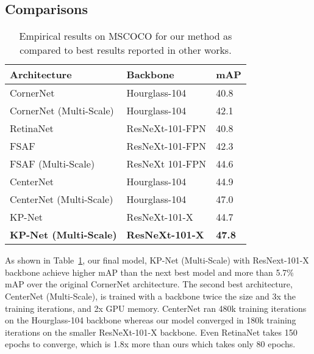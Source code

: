 \documentclass[10pt,twocolumn,letterpaper]{article}
\begin{document}
\subsection{Comparisons}
\vspace{-0.25cm}
\begin{table}[]
\caption{Empirical results on MSCOCO for our method as compared to best results reported in other works.}
\begin{tabular}{@{}lll@{}}
 \hline
\textbf{Architecture}              & \textbf{Backbone}      & \textbf{mAP}  \\
 \hline
CornerNet \cite{law2018cornernet}                         & Hourglass-104           & 40.8          \\
CornerNet (Multi-Scale)   \cite{law2018cornernet}           & Hourglass-104           & 42.1          \\
RetinaNet  \cite{lin2017focal}                        & ResNeXt-101-FPN        & 40.8          \\
FSAF \cite{zhu2019feature}                              & ResNeXt-101-FPN        & 42.3          \\
FSAF (Multi-Scale) \cite{zhu2019feature}                & ResNeXt 101-FPN        & 44.6          \\
CenterNet \cite{duan2019centernet}                       & Hourglass-104           & 44.9          \\
CenterNet (Multi-Scale) \cite{duan2019centernet}         & Hourglass-104           & 47.0          \\  \hline
KP-Net                            & ResNeXt-101-X          & 44.7 \\ 
\textbf{KP-Net (Multi-Scale)}     & \textbf{ResNeXt-101-X}   & \textbf{47.8}   \\ 
\hline
\end{tabular}

\label{table:results}
\vspace{-0.5cm}
\end{table}

As shown in Table~\ref{table:results}, our final model, KP-Net (Multi-Scale) with ResNext-101-X backbone achieve higher mAP than the next best model and more than 5.7\% mAP over the original CornerNet architecture. The second best architecture, CenterNet (Multi-Scale), is trained with a backbone twice the size and 3x the training iterations, and 2x GPU memory. CenterNet ran 480k training iterations on the Hourglass-104 backbone whereas our model converged in 180k training iterations on the smaller ResNeXt-101-X backbone. Even RetinaNet takes 150 epochs to converge, which is 1.8x more than ours which takes only 80 epochs. 
  
\end{document}
